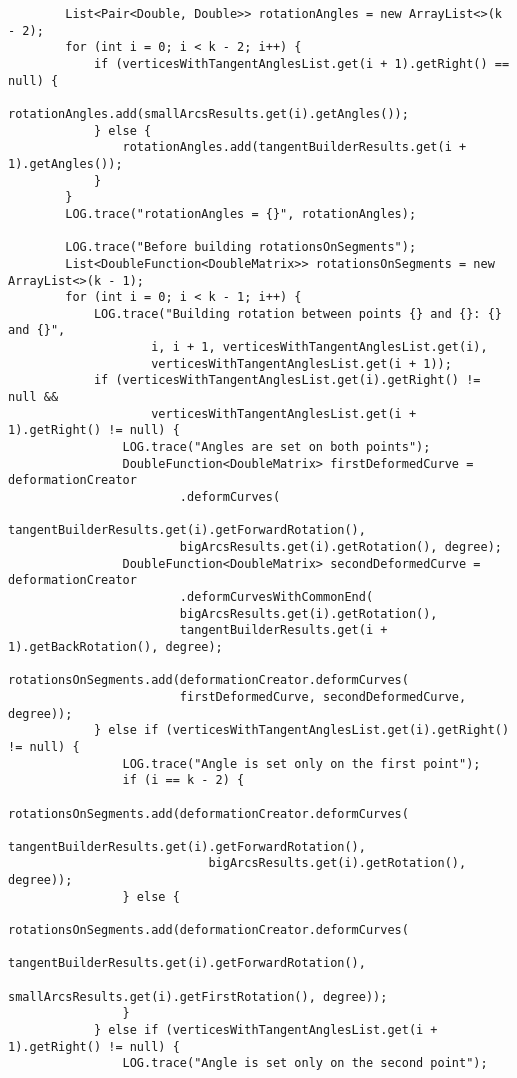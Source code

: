 \begin{verbatim}
        List<Pair<Double, Double>> rotationAngles = new ArrayList<>(k - 2);
        for (int i = 0; i < k - 2; i++) {
            if (verticesWithTangentAnglesList.get(i + 1).getRight() == null) {
                rotationAngles.add(smallArcsResults.get(i).getAngles());
            } else {
                rotationAngles.add(tangentBuilderResults.get(i + 1).getAngles());
            }
        }
        LOG.trace("rotationAngles = {}", rotationAngles);

        LOG.trace("Before building rotationsOnSegments");
        List<DoubleFunction<DoubleMatrix>> rotationsOnSegments = new ArrayList<>(k - 1);
        for (int i = 0; i < k - 1; i++) {
            LOG.trace("Building rotation between points {} and {}: {} and {}",
                    i, i + 1, verticesWithTangentAnglesList.get(i),
                    verticesWithTangentAnglesList.get(i + 1));
            if (verticesWithTangentAnglesList.get(i).getRight() != null &&
                    verticesWithTangentAnglesList.get(i + 1).getRight() != null) {
                LOG.trace("Angles are set on both points");
                DoubleFunction<DoubleMatrix> firstDeformedCurve = deformationCreator
                        .deformCurves(
                        tangentBuilderResults.get(i).getForwardRotation(),
                        bigArcsResults.get(i).getRotation(), degree);
                DoubleFunction<DoubleMatrix> secondDeformedCurve = deformationCreator
                        .deformCurvesWithCommonEnd(
                        bigArcsResults.get(i).getRotation(),
                        tangentBuilderResults.get(i + 1).getBackRotation(), degree);
                rotationsOnSegments.add(deformationCreator.deformCurves(
                        firstDeformedCurve, secondDeformedCurve, degree));
            } else if (verticesWithTangentAnglesList.get(i).getRight() != null) {
                LOG.trace("Angle is set only on the first point");
                if (i == k - 2) {
                    rotationsOnSegments.add(deformationCreator.deformCurves(
                            tangentBuilderResults.get(i).getForwardRotation(),
                            bigArcsResults.get(i).getRotation(), degree));
                } else {
                    rotationsOnSegments.add(deformationCreator.deformCurves(
                            tangentBuilderResults.get(i).getForwardRotation(),
                            smallArcsResults.get(i).getFirstRotation(), degree));
                }
            } else if (verticesWithTangentAnglesList.get(i + 1).getRight() != null) {
                LOG.trace("Angle is set only on the second point");

\end{verbatim}
